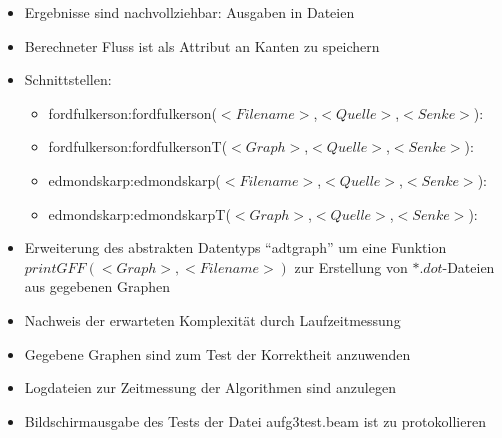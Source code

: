 \documentclass[11pt]{article}
\begin{document}
    \begin{itemize}
        \item Ergebnisse sind nachvollziehbar: Ausgaben in Dateien
        \item Berechneter Fluss ist als Attribut an Kanten zu speichern
        \item Schnittstellen:
        \begin{itemize}
            \item fordfulkerson:fordfulkerson($<Filename>$,$<Quelle>$,$<Senke>$):\\ 
            \item fordfulkerson:fordfulkersonT($<Graph>$,$<Quelle>$,$<Senke>$):\\ 
            \item edmondskarp:edmondskarp($<Filename>$,$<Quelle>$,$<Senke>$):\\ 
            \item edmondskarp:edmondskarpT($<Graph>$,$<Quelle>$,$<Senke>$):\\ 
        \end{itemize}
        \item Erweiterung des abstrakten Datentyps "`adtgraph"' um eine Funktion \newline $printGFF(<Graph>,<Filename>)$ zur Erstellung von $*.dot$-Dateien aus gegebenen Graphen
        \item Nachweis der erwarteten Komplexit\"at durch Laufzeitmessung
        \item Gegebene Graphen sind zum Test der Korrektheit anzuwenden
        \item Logdateien zur Zeitmessung der Algorithmen sind anzulegen
        \item Bildschirmausgabe des Tests der Datei aufg3test.beam ist zu protokollieren
    \end{itemize}
\end{document}
